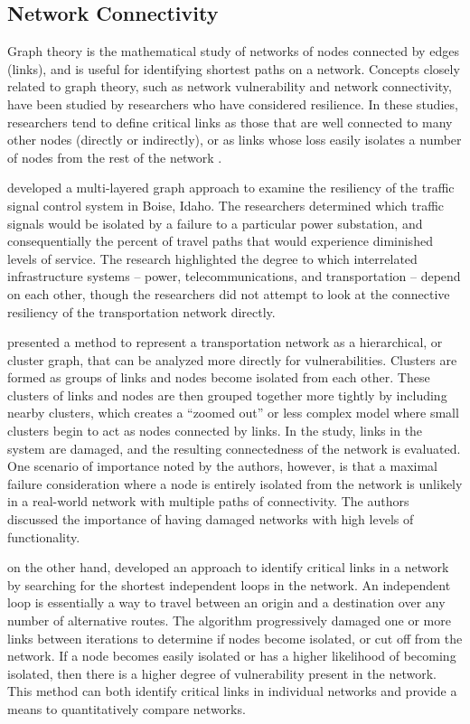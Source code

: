 \subsection{Network Connectivity}

Graph theory is the mathematical study of networks of nodes connected by
edges (links), and is useful for identifying shortest paths on a network.
Concepts closely related to graph theory, such as network
vulnerability and network connectivity, have been studied by researchers who
have considered resilience. In these studies, researchers tend to define
critical links as those
that are well connected to many other nodes (directly or indirectly), or as links
whose loss easily isolates a
number of nodes from the rest of the network \citep{west2001}.

\citet{abdel2007} developed a multi-layered graph approach to examine the resiliency
of the traffic
signal control system in Boise, Idaho. The researchers determined which
traffic signals would be isolated by a failure to a particular power
substation,
and consequentially the percent of travel paths that would experience
diminished
levels of service. The research highlighted the degree to which interrelated
infrastructure systems -- power, telecommunications, and transportation --
depend on each other, though the researchers did not attempt to look at the
connective resiliency of the transportation network directly.

\citet{agarwal2011} presented a method to represent a transportation network
as a
hierarchical, or cluster graph, that can be analyzed more directly for
vulnerabilities. Clusters are formed as groups of links and nodes become
isolated from each other. These clusters of links and nodes are then grouped
together more tightly by including nearby clusters, which creates a
``zoomed out'' or less complex model where small clusters begin to act as nodes connected by links.
In the study, links in the system are damaged, and the resulting
connectedness of the network is evaluated. One scenario of importance
noted by the authors, however, is that a maximal failure consideration where a
node
is entirely isolated from the network is unlikely in a real-world network
with
multiple paths of connectivity. The authors discussed the importance of
having damaged networks with high levels of functionality.

\citet{vodak2019}
on the other hand, developed an approach to identify
critical links in a network by searching for the shortest independent
loops in the network. An independent loop is essentially a way to travel
between an origin and a destination over any number of alternative routes.
The algorithm progressively damaged one or more links
between iterations to determine if nodes become isolated, or cut off from
the
network. If a node becomes easily isolated or has a higher likelihood of
becoming isolated, then there is a higher degree of vulnerability present
in the
network. This method can both identify critical links in individual
networks and provide a means to quantitatively compare networks.

